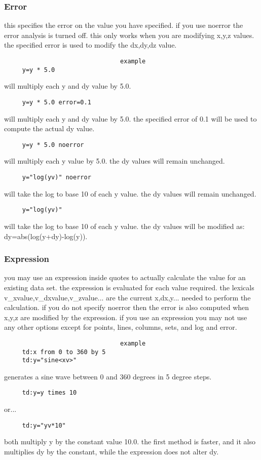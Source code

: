 \subsubsection{Error}
this  specifies  the error on the value you have specified.  if you use
noerror the error analysis is turned off.  this only works when you are
modifying  x,y,z  values.   the  specified  error is used to modify the
dx,dy,dz value.  
\begin{verbatim}
                                example
     y=y * 5.0 
\end{verbatim}
will multiply each y and dy value by 5.0.  
\begin{verbatim}
     y=y * 5.0 error=0.1 
\end{verbatim}
will  multiply  each y and dy value by 5.0.  the specified error of 0.1
will be used to compute the actual dy value.  
\begin{verbatim}
     y=y * 5.0 noerror 
\end{verbatim}
will  multiply  each  y  value  by  5.0.   the  dy  values  will remain
unchanged.  
\begin{verbatim}
     y="log(yv)" noerror 
\end{verbatim}
will  take  the  log  to  base  10 of each y value.  the dy values will
remain unchanged.  
\begin{verbatim}
     y="log(yv)" 
\end{verbatim}
will  take  the  log to base 10 of each y value.  the dy values will be
modified as:  dy=abs(log(y+dy)-log(y)).  
\subsubsection{Expression}
you may use an expression inside quotes to actually calculate the value
for an existing data set.  the expression is evaluated for  each  value
required.  the lexicals v\_xvalue,v\_dxvalue,v\_zvalue...  are the current
x,dx,y...  needed to perform the calculation.  if you  do  not  specify
noerror  then the error is also computed when x,y,z are modified by the
expression.  if you use an expression you may not use any other options
except for points, lines, columns, sets, and log and error.  

\begin{verbatim}
                                example
     td:x from 0 to 360 by 5 
     td:y="sine<xv>" 
\end{verbatim}
generates a sine wave between 0 and 360 degrees in 5 degree steps.  
\begin{verbatim}
     td:y=y times 10 
\end{verbatim}
or...  
\begin{verbatim}
     td:y="yv*10" 
\end{verbatim}
both  multiply  y  by  the  constant  value  10.0.  the first method is
faster, and it also multiplies dy by the constant, while the expression
does not alter dy.  
